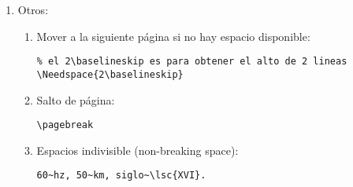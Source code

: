 \begin{enumerate}
\item Otros:
\begin{enumerate}
	\item Mover a la siguiente página si no hay espacio disponible:
	\begin{lstlisting}
% el 2\baselineskip es para obtener el alto de 2 lineas
\Needspace{2\baselineskip}
	\end{lstlisting}
	
	\item Salto de página:
	\begin{lstlisting}
\pagebreak
	\end{lstlisting}
	
	\item Espacios indivisible (non-breaking space):
	\begin{lstlisting}
60~hz, 50~km, siglo~\lsc{XVI}.
	\end{lstlisting}
	\lstset{style=bash}
\end{enumerate}

\end{enumerate}